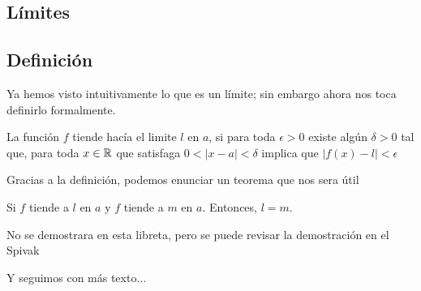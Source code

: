 
\begin{center} \section{Límites} \end{center}

\subsection{Definición}

Ya hemos visto intuitivamente lo que es un límite; sin embargo ahora nos toca definirlo formalmente.
\begin{definicion}
    La función $f$ tiende hacía el limite $l$ en $a$, si para toda $\epsilon > 0$ existe algún $\delta > 0$ tal que, para toda $x \in \mathbb{R}$ que satisfaga $0 < |x - a| < \delta$ implica que $|f(x) - l| < \epsilon$
\end{definicion}

Gracias a la definición, podemos enunciar un teorema que nos sera útil 
\begin{teorema}
    Si $f$ tiende a $l$ en $a$ y $f$ tiende a $m$ en $a$. Entonces, $l = m$.
\end{teorema}

\begin{demostracion}
    No se demostrara en esta libreta, pero se puede revisar la demostración en el Spivak
\end{demostracion}

Y seguimos con más texto...